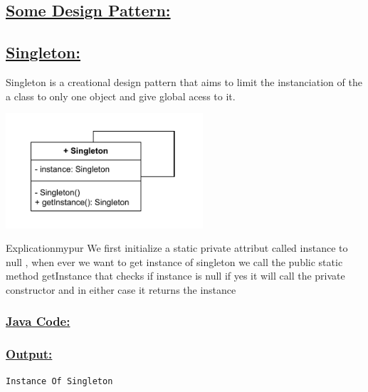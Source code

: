 \newpage
\subsection*{\underline{Some Design Pattern:}}

\subsection*{\underline{Singleton:}}
Singleton is a creational design pattern that aims to limit the instanciation
of the a class to only one object and give global acess to it.

\begin{center}
\includegraphics[width=0.55\textwidth,height=0.3\textheight]{Chapters/DesignPattern/Singleton/single.drawio.pdf}
\end{center}

\begin{prettyBox}{Explication}{mypur}
We first initialize a static private attribut called instance to null , when ever we want to get instance of singleton
we call the public static method getInstance that checks if instance is null if yes it will call the private constructor
and in either case it returns the instance 
\end{prettyBox}

\vspace{0.25cm}
\subsubsection*{\underline{Java Code:}}






\subsubsection*{\underline{Output:}}
\begin{lstlisting}[style=cmd]
Instance Of Singleton
\end{lstlisting}

